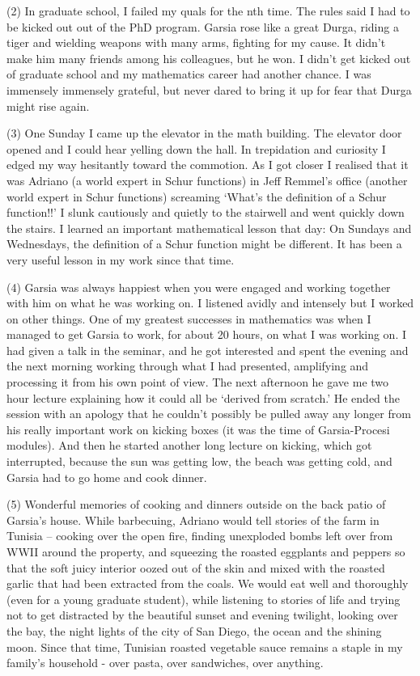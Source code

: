 \documentclass{notices}
\begin{document}
(2) In graduate school, I failed my quals for the nth time.  
The rules said I had to be kicked out out of the PhD program.
Garsia rose like a great Durga,
riding a tiger and wielding weapons with many arms,
fighting for my cause.  
It didn't make him many friends among his colleagues, but he won.
I didn't get kicked out of graduate school and
my mathematics career had another chance.
I was immensely immensely grateful,
but never dared to bring it up
for fear that Durga might rise again.

(3) One Sunday I came up the elevator in the math building.
The elevator door opened and  I could hear yelling down the hall.  
In trepidation and curiosity I edged my way hesitantly toward the commotion.  
As I got closer I realised that it was Adriano (a world expert in Schur functions)
in Jeff Remmel's office (another world expert in Schur functions)
screaming `What's the definition of a Schur function!!'
I slunk cautiously and quietly to the stairwell and went quickly down the stairs.
I learned an important mathematical lesson that day:
On Sundays and Wednesdays,
the definition of a Schur function might be different.
It has been a very useful lesson in my work since that time.

(4) Garsia was always happiest when you were engaged and working
together with him on what he was working on.
I listened avidly and intensely but I worked on other things.  
One of my greatest successes in mathematics was
when I  managed to get Garsia to work,
for about 20 hours, on what I was working on.  
I had given a talk in the seminar, and he got interested
and spent the evening and the next morning
working through what I had presented,
amplifying and processing it from his own point of view.    
The next afternoon he gave me two hour lecture explaining
how it could all be `derived from scratch.'  
He ended the session with an apology
that he couldn't possibly be pulled away any longer
from his really important work on kicking boxes
(it was the time of Garsia-Procesi modules).  
And then he started another long lecture on kicking,
which got interrupted, because
the sun was getting low,
the beach was getting cold,
and Garsia had to go home and cook dinner.

(5) Wonderful memories of cooking and dinners
outside on the back patio of Garsia's house.  
While barbecuing, Adriano would tell stories of the farm in Tunisia --
cooking over the open fire,
finding unexploded bombs left over from  WWII around the property,
and squeezing the roasted eggplants and peppers
so that the soft juicy interior  oozed out of the skin and
mixed with the  roasted garlic that had been extracted from the coals.  
We would eat well and  thoroughly
(even for a young graduate student),
while listening to stories of life and
trying not to get distracted by the beautiful sunset
and evening twilight, looking over the bay,
the night lights of the city of San Diego,
the ocean and the shining moon.
Since that time, Tunisian roasted vegetable sauce remains
a staple in my family's household - over pasta, over sandwiches, over anything.
\end{document}
